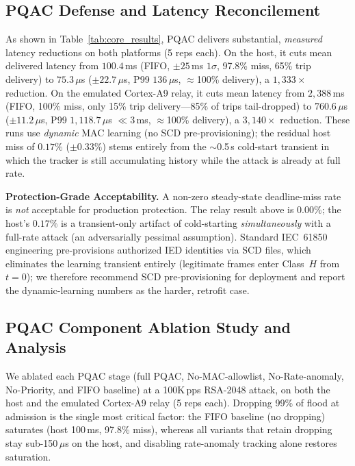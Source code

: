 \documentclass[journal]{IEEEtran}
\begin{document}
\subsection{PQAC Defense and Latency Reconcilement}
As shown in Table~\ref{tab:core_results}, PQAC delivers substantial, \emph{measured} latency reductions on both platforms (5 reps each). On the host, it cuts mean delivered latency from $100.4$\,ms (FIFO, $\pm 25$\,ms $1\sigma$, 97.8\% miss, 65\% trip delivery) to $75.3$\,$\mu$s ($\pm 22.7\,\mu$s, P99 $136\,\mu$s, $\approx$100\% delivery), a $1{,}333\times$ reduction. On the emulated Cortex-A9 relay, it cuts mean latency from $2{,}388$\,ms (FIFO, 100\% miss, only 15\% trip delivery---85\% of trips tail-dropped) to $760.6\,\mu$s ($\pm 11.2\,\mu$s, P99 $1{,}118.7\,\mu$s $\ll 3$\,ms, $\approx$100\% delivery), a $3{,}140\times$ reduction. These runs use \emph{dynamic} MAC learning (no SCD pre-provisioning); the residual host miss of $0.17\%$ ($\pm 0.33\%$) stems entirely from the $\sim$0.5\,s cold-start transient in which the tracker is still accumulating history while the attack is already at full rate.

\textbf{Protection-Grade Acceptability.} A non-zero steady-state deadline-miss rate is \emph{not} acceptable for production protection. The relay result above is $0.00\%$; the host's $0.17\%$ is a transient-only artifact of cold-starting \emph{simultaneously} with a full-rate attack (an adversarially pessimal assumption). Standard IEC~61850 engineering pre-provisions authorized IED identities via SCD files, which eliminates the learning transient entirely (legitimate frames enter Class~$H$ from $t=0$); we therefore recommend SCD pre-provisioning for deployment and report the dynamic-learning numbers as the harder, retrofit case.

\subsection{PQAC Component Ablation Study and Analysis}
We ablated each PQAC stage (full PQAC, No-MAC-allowlist, No-Rate-anomaly, No-Priority, and FIFO baseline) at a 100K\,pps RSA-2048 attack, on both the host and the emulated Cortex-A9 relay (5 reps each). Dropping 99\% of flood at admission is the single most critical factor: the FIFO baseline (no dropping) saturates (host 100\,ms, 97.8\% miss), whereas all variants that retain dropping stay sub-150\,$\mu$s on the host, and disabling rate-anomaly tracking alone restores saturation.
\end{document}

